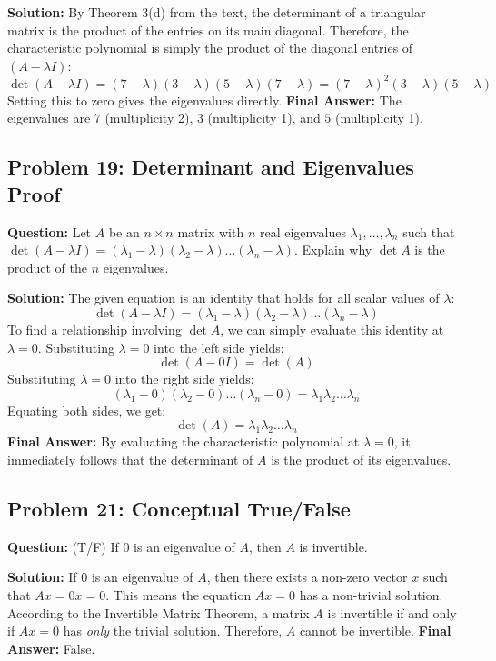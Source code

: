 \documentclass[11pt, a4paper]{article}
\theoremstyle{definition}
\theoremstyle{remark}
\begin{document}
\textbf{Solution:}
By Theorem 3(d) from the text, the determinant of a triangular matrix is the product of the entries on its main diagonal. Therefore, the characteristic polynomial is simply the product of the diagonal entries of $(A - \lambda I)$:
\[ \det(A - \lambda I) = (7 - \lambda)(3 - \lambda)(5 - \lambda)(7 - \lambda) = (7 - \lambda)^2(3 - \lambda)(5 - \lambda) \]
Setting this to zero gives the eigenvalues directly.
\textbf{Final Answer:} The eigenvalues are $7$ (multiplicity 2), $3$ (multiplicity 1), and $5$ (multiplicity 1).

\subsection{Problem 19: Determinant and Eigenvalues Proof}
\textbf{Question:} Let $A$ be an $n \times n$ matrix with $n$ real eigenvalues $\lambda_1, \dots, \lambda_n$ such that $\det(A - \lambda I) = (\lambda_1 - \lambda)(\lambda_2 - \lambda)\dots(\lambda_n - \lambda)$. Explain why $\det A$ is the product of the $n$ eigenvalues.

\textbf{Solution:}
The given equation is an identity that holds for all scalar values of $\lambda$:
\[ \det(A - \lambda I) = (\lambda_1 - \lambda)(\lambda_2 - \lambda)\dots(\lambda_n - \lambda) \]
To find a relationship involving $\det A$, we can simply evaluate this identity at $\lambda = 0$.
Substituting $\lambda = 0$ into the left side yields:
\[ \det(A - 0I) = \det(A) \]
Substituting $\lambda = 0$ into the right side yields:
\[ (\lambda_1 - 0)(\lambda_2 - 0)\dots(\lambda_n - 0) = \lambda_1 \lambda_2 \dots \lambda_n \]
Equating both sides, we get:
\[ \det(A) = \lambda_1 \lambda_2 \dots \lambda_n \]
\textbf{Final Answer:} By evaluating the characteristic polynomial at $\lambda = 0$, it immediately follows that the determinant of $A$ is the product of its eigenvalues.

\subsection{Problem 21: Conceptual True/False}
\textbf{Question:} (T/F) If $0$ is an eigenvalue of $A$, then $A$ is invertible.

\textbf{Solution:}
If $0$ is an eigenvalue of $A$, then there exists a non-zero vector $x$ such that $Ax = 0x = 0$. This means the equation $Ax = 0$ has a non-trivial solution. According to the Invertible Matrix Theorem, a matrix $A$ is invertible if and only if $Ax = 0$ has \textit{only} the trivial solution. Therefore, $A$ cannot be invertible.
\textbf{Final Answer:} False.
\end{document}
